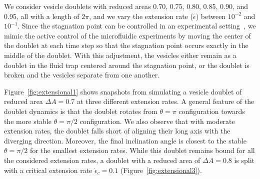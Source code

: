 \documentclass[prf,superscriptaddress,showkeys,longbibliography]{revtex4-1}
\begin{document}
We consider vesicle doublets with reduced areas 0.70, 0.75, 0.80, 0.85,
0.90, and 0.95, all with a length of $2\pi$, and we vary the extension
rate ($\dot\epsilon$) between $10^{-2}$ and $10^{-1}$.  Since the stagnation
point can be controlled in an experimental
setting~\cite{BentleyLeal1986_JFMa,Johnson-Chavarria2011_EMJ}, we mimic the active control of
the microfluidic experiments by moving the center of the doublet at each
time step so that the stagnation point occurs exactly in the middle of
the doublet.  With this adjustment, the vesicles either remain as a
doublet in the fluid trap centered around the stagnation point, or the
doublet is broken and the vesicles separate from one another.  

Figure~\ref{fig:extensional1} shows snapshots from simulating a vesicle doublet of reduced area  $\Delta A = 0.7$
at three different extension rates. A general feature of the doublet dynamics is that the doublet rotates from
$\theta=\pi$ configuration towards the more stable $\theta=\pi/2$
configuration.  
%
We also
observe that with moderate extension rates, the doublet falls short of
aligning their long axis with the diverging direction.  Moreover, the
final inclination angle is closest to the stable $\theta=\pi/2$ for the
smallest extension rates. While this doublet remains bound for all
the considered extension rates, a doublet with a reduced area of
$\Delta A = 0.8$ is split with a critical extension rate $\dot\epsilon_c =
0.1$ (Figure~\ref{fig:extensional3}).  
\end{document}
